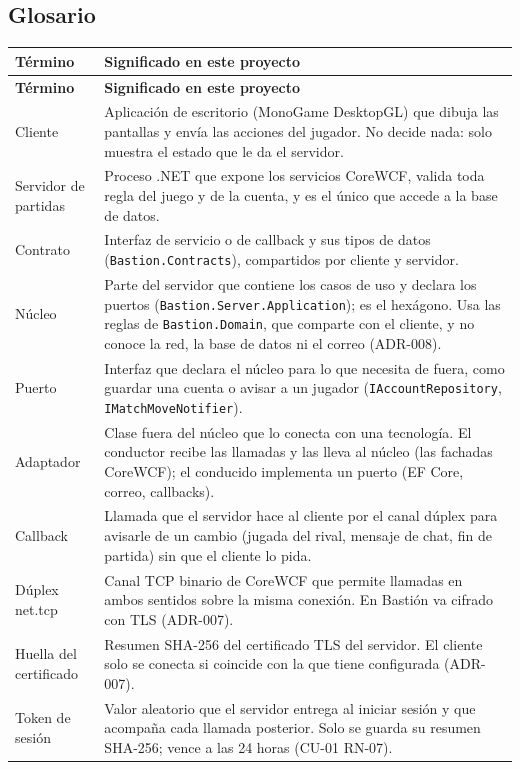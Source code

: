 \documentclass[11pt,letterpaper]{article}
\newcommand{\hd}[1]{\textbf{\small #1}}
\newcommand{\headrow}{\rowcolor{SADHead}}
\begin{document}
\subsection{Glosario}
\begin{xltabular}{\linewidth}{|p{5.2cm}|Y|}\hline
  \headrow\hd{Término} & \hd{Significado en este proyecto}\\\hline
  \endfirsthead
  \headrow\hd{Término} & \hd{Significado en este proyecto}\\\hline
  \endhead
  Cliente & Aplicación de escritorio (MonoGame DesktopGL) que dibuja las pantallas y envía las acciones del jugador. No decide nada: solo muestra el estado que le da el servidor.\\\hline
  Servidor de partidas & Proceso .NET que expone los servicios CoreWCF, valida toda regla del juego y de la cuenta, y es el único que accede a la base de datos.\\\hline
  Contrato & Interfaz de servicio o de callback y sus tipos de datos (\texttt{Bastion.Contracts}), compartidos por cliente y servidor.\\\hline
  Núcleo & Parte del servidor que contiene los casos de uso y declara los puertos (\texttt{Bastion.Server.Application}); es el hexágono. Usa las reglas de \texttt{Bastion.Domain}, que comparte con el cliente, y no conoce la red, la base de datos ni el correo (ADR-008).\\\hline
  Puerto & Interfaz que declara el núcleo para lo que necesita de fuera, como guardar una cuenta o avisar a un jugador (\texttt{IAccountRepository}, \texttt{IMatchMoveNotifier}).\\\hline
  Adaptador & Clase fuera del núcleo que lo conecta con una tecnología. El conductor recibe las llamadas y las lleva al núcleo (las fachadas CoreWCF); el conducido implementa un puerto (EF Core, correo, callbacks).\\\hline
  Callback & Llamada que el servidor hace al cliente por el canal dúplex para avisarle de un cambio (jugada del rival, mensaje de chat, fin de partida) sin que el cliente lo pida.\\\hline
  Dúplex net.tcp & Canal TCP binario de CoreWCF que permite llamadas en ambos sentidos sobre la misma conexión. En Bastión va cifrado con TLS (ADR-007).\\\hline
  Huella del certificado & Resumen SHA-256 del certificado TLS del servidor. El cliente solo se conecta si coincide con la que tiene configurada (ADR-007).\\\hline
  Token de sesión & Valor aleatorio que el servidor entrega al iniciar sesión y que acompaña cada llamada posterior. Solo se guarda su resumen SHA-256; vence a las 24 horas (CU-01 RN-07).\\\hline

\end{xltabular}
\end{document}
